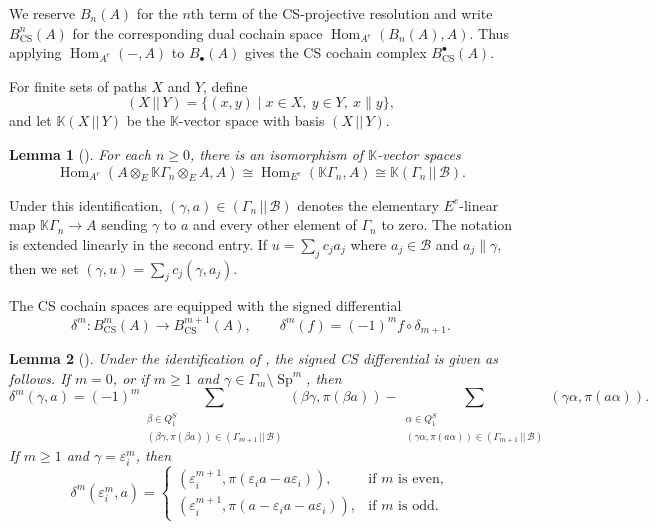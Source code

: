 \documentclass[11pt,a4paper,reqno]{amsart}
\newcommand{\mK}{\mathbb K}
\newcommand{\mB}{\mathcal B}
\newcommand{\Hom}{\operatorname{Hom}}
\newcommand{\Sp}{\operatorname{Sp}}
\newcommand{\para}[2]{(#1,#2)}
\newcommand{\Para}[2]{(#1\,||\,#2)}
\newcommand{\ep}{\varepsilon}
\theoremstyle{plain}
\newtheorem{lemma}[lemma]{Lemma}
\theoremstyle{definition}
\numberwithin{equation}{section}
\begin{document}
	
	We reserve $B_n(A)$ for the $n$th term of the CS-projective resolution and
	write $B_{\mathrm{CS}}^n(A)$ for the corresponding dual cochain space
	$\Hom_{A^e}(B_n(A),A)$.  Thus applying
	$\Hom_{A^e}(-,A)$ to $B_\bullet(A)$ gives the CS cochain complex
	$B_{\mathrm{CS}}^\bullet(A)$.
	
	For finite sets of paths $X$ and $Y$, define
	\[
	\Para{X}{Y}
	=
	\{\para{x}{y}\mid x\in X,\ y\in Y,\ x\parallel y\},
	\]
	and let $\mK\Para{X}{Y}$ be the $\mK$-vector space with basis
	$\Para{X}{Y}$.
	
	\begin{lemma}[{\cite{Cib90}}]
		\label{lem:CS-cochain-identification}
		For each $n\geq0$, there is an isomorphism of $\mK$-vector spaces
		\[
		\Hom_{A^e}(A\otimes_E\mK\Gamma_n\otimes_E A,A)
		\cong
		\Hom_{E^e}(\mK\Gamma_n,A)
		\cong
		\mK\Para{\Gamma_n}{\mB}.
		\]
	\end{lemma}
	
	Under this identification, 
	$\para{\gamma}{a}\in\Para{\Gamma_n}{\mB}$ denotes the elementary
	$E^e$-linear map $\mK\Gamma_n\to A$ sending $\gamma$ to $a$ and every other element of
	$\Gamma_n$ to zero. The notation is extended linearly in the
	second entry. If $u=\sum_j c_j a_j$ where $a_j\in\mB$ and $a_j\parallel\gamma$, then 
	we set
	$\para{\gamma}{u}
	=
	\sum_j c_j\para{\gamma}{a_j}$.
	
	The CS cochain spaces are equipped with the signed differential
	\begin{equation}\label{eq:signed-CS-differential}
		\delta^m:B_{\mathrm{CS}}^m(A)\longrightarrow B_{\mathrm{CS}}^{m+1}(A),
		\qquad
		\delta^m(f)=(-1)^m f\circ\delta_{m+1}.
	\end{equation}
	
	\begin{lemma}[{\cite[Proposition~2.10]{BSSWW26}}]
		\label{lem:dual-differential}
		Under the identification of
		, the signed CS differential is
		given as follows. If $m=0$, or if $m\geq1$ and
		$\gamma\in\Gamma_m\setminus\Sp^m$, then
		\[\delta^m\para{\gamma}{a}
			=
			(-1)^m
			\sum_{\substack{\beta\in Q_1^S\\
					\para{\beta\gamma}{\pi(\beta a)}
					\in\Para{\Gamma_{m+1}}{\mB}}}
			\para{\beta\gamma}{\pi(\beta a)}
			-
			\sum_{\substack{\alpha\in Q_1^S\\
					\para{\gamma\alpha}{\pi(a\alpha)}
					\in\Para{\Gamma_{m+1}}{\mB}}}
			\para{\gamma\alpha}{\pi(a\alpha)}.\]
		If $m\geq1$ and $\gamma=\ep_i^m$, then
		\[
		\delta^m\para{\ep_i^m}{a}
		=
		\begin{cases}
			\para{\ep_i^{m+1}}{\pi(\ep_i a-a\ep_i)},
			& \text{if } m\text{ is even},\\
			\para{\ep_i^{m+1}}{\pi(a-\ep_i a-a\ep_i)},
			& \text{if } m\text{ is odd}.
		\end{cases}
		\]
	\end{lemma}
\end{document}
